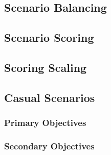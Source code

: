 

\subsection{Scenario Balancing}



\subsection{Scenario Scoring}
\label{subsec:scenario_scoring}



\subsection{Scoring Scaling}



\newpage

\subsection{Casual Scenarios}



\subsubsection{Primary Objectives}



\subsubsection{Secondary Objectives}



